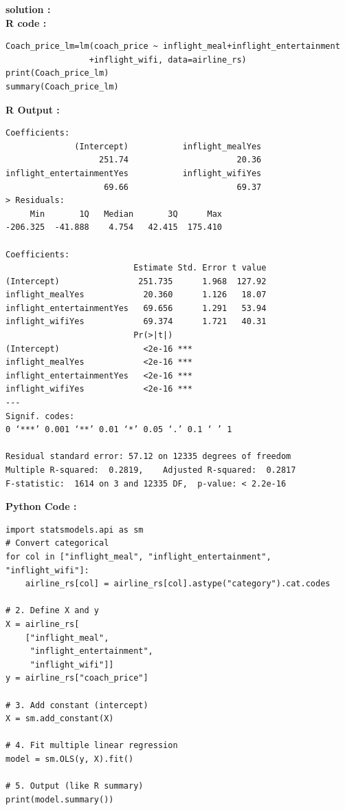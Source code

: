 \documentclass[11pt,a4paper]{article}
\begin{document}
\vspace{1em}
\noindent \textbf{solution :}\\
\noindent\textbf{R code :}
\begin{codebox}
\begin{lstlisting}[style=Rstyle]
Coach_price_lm=lm(coach_price ~ inflight_meal+inflight_entertainment
                 +inflight_wifi, data=airline_rs)
print(Coach_price_lm)
summary(Coach_price_lm)
\end{lstlisting}
\end{codebox}
\vspace{0.5em}
\noindent \textbf{R Output :}
\begin{verbatim}
Coefficients:
              (Intercept)           inflight_mealYes  
                   251.74                      20.36  
inflight_entertainmentYes           inflight_wifiYes  
                    69.66                      69.37
> Residuals:
     Min       1Q   Median       3Q      Max 
-206.325  -41.888    4.754   42.415  175.410 

Coefficients:
                          Estimate Std. Error t value
(Intercept)                251.735      1.968  127.92
inflight_mealYes            20.360      1.126   18.07
inflight_entertainmentYes   69.656      1.291   53.94
inflight_wifiYes            69.374      1.721   40.31
                          Pr(>|t|)    
(Intercept)                 <2e-16 ***
inflight_mealYes            <2e-16 ***
inflight_entertainmentYes   <2e-16 ***
inflight_wifiYes            <2e-16 ***
---
Signif. codes:  
0 ‘***’ 0.001 ‘**’ 0.01 ‘*’ 0.05 ‘.’ 0.1 ‘ ’ 1

Residual standard error: 57.12 on 12335 degrees of freedom
Multiple R-squared:  0.2819,	Adjusted R-squared:  0.2817 
F-statistic:  1614 on 3 and 12335 DF,  p-value: < 2.2e-16

\end{verbatim}
\vspace{0.5em}
\noindent \textbf{Python Code :}
\begin{codebox}
\begin{lstlisting}[style=Pythonstyle]
import statsmodels.api as sm
# Convert categorical
for col in ["inflight_meal", "inflight_entertainment", "inflight_wifi"]:
    airline_rs[col] = airline_rs[col].astype("category").cat.codes
    
# 2. Define X and y
X = airline_rs[
    ["inflight_meal",
     "inflight_entertainment",
     "inflight_wifi"]]
y = airline_rs["coach_price"]

# 3. Add constant (intercept)
X = sm.add_constant(X)

# 4. Fit multiple linear regression
model = sm.OLS(y, X).fit()

# 5. Output (like R summary)
print(model.summary())
\end{lstlisting}
\end{codebox}
\end{document}
